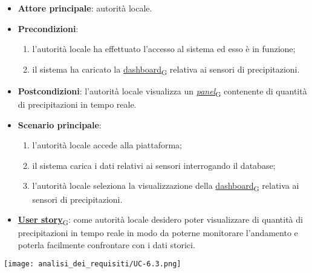 \newpage

\begin{itemize}
	\item \textbf{Attore principale}: autorità locale.
	\item \textbf{Precondizioni}:
	      \begin{enumerate}
		      \item l'autorità locale ha effettuato l'accesso al sistema ed esso è in funzione;
		      \item il sistema ha caricato la \href{https://7last.github.io/docs/rtb/documentazione-interna/glossario\#dashboard}{dashboard\textsubscript{G}} relativa ai sensori di precipitazioni.
	      \end{enumerate}
	\item \textbf{Postcondizioni}: l'autorità locale visualizza un \href{https://7last.github.io/docs/rtb/documentazione-interna/glossario\#panel}{\textit{panel}\textsubscript{G}} contenente di quantità di precipitazioni in tempo reale.
	\item \textbf{Scenario principale}:
	      \begin{enumerate}
		      \item l'autorità locale accede alla piattaforma;
		      \item il sistema carica i dati relativi ai sensori interrogando il database;
		      \item l'autorità locale seleziona la visualizzazione della \href{https://7last.github.io/docs/rtb/documentazione-interna/glossario\#dashboard}{dashboard\textsubscript{G}} relativa ai sensori di precipitazioni.
	      \end{enumerate}
	\item \href{https://7last.github.io/docs/rtb/documentazione-interna/glossario\#user-story}{\textbf{User story}\textsubscript{G}}:
	      come autorità locale desidero poter visualizzare di quantità di precipitazioni in tempo reale in modo da poterne monitorare l'andamento
	      e poterla facilmente confrontare con i dati storici.
\end{itemize}
\begin{center}
	\texttt{[image: analisi\_dei\_requisiti/UC-6.3.png]}
\end{center}

